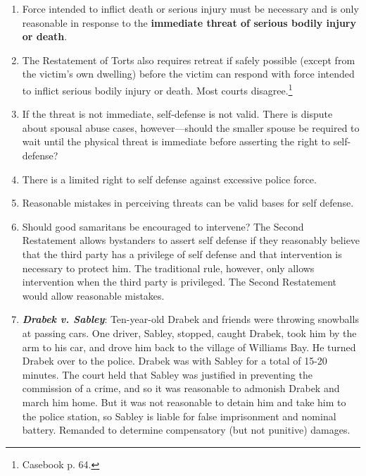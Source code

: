 \begin{enumerate}
    \item Force intended to inflict death or serious injury must be necessary and is only reasonable in response to the \textbf{immediate threat of serious bodily injury or death}.
    \item The Restatement of Torts also requires retreat if safely possible (except from the victim's own dwelling) before the victim can respond with force intended to inflict serious bodily injury or death. Most courts disagree.\footnote{Casebook p. 64.}
    \item If the threat is not immediate, self-defense is not valid. There is dispute about spousal abuse cases, however---should the smaller spouse be required to wait until the physical threat is immediate before asserting the right to self-defense?
    \item There is a limited right to self defense against excessive police force.
    \item Reasonable mistakes in perceiving threats can be valid bases for self defense.
    \item Should good samaritans be encouraged to intervene? The Second Restatement allows bystanders to assert self defense if they reasonably believe that the third party has a privilege of self defense and that intervention is necessary to protect him. The traditional rule, however, only allows intervention when the third party is privileged. The Second Restatement would allow reasonable mistakes.
    \item \textbf{\emph{Drabek v. Sabley}}: Ten-year-old Drabek and friends were throwing snowballs at passing cars. One driver, Sabley, stopped, caught Drabek, took him by the arm to his car, and drove him back to the village of Williams Bay. He turned Drabek over to the police. Drabek was with Sabley for a total of 15-20 minutes. The court held that Sabley was justified in preventing the commission of a crime, and so it was reasonable to admonish Drabek and march him home. But it was not reasonable to detain him and take him to the police station, so Sabley is liable for false imprisonment and nominal battery. Remanded to determine compensatory (but not punitive) damages.
\end{enumerate}

